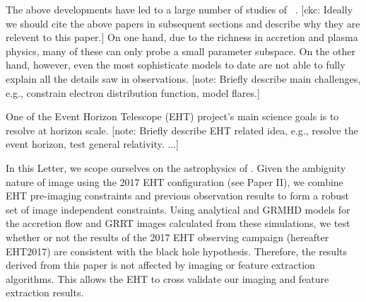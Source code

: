 \documentclass[twocolumn,tighten,dvipsnames,linenumbers]{aastex63}
\newcommand\note[1]{{\color{OliveGreen}[note: #1]}}
\newcommand\ckc[1]{{\color{MidnightBlue}[ckc: #1]}}
\begin{document}

The above developments have led to a large number of studies of
\sgra~\citep[e.g.,][]{2006MNRAS.370..219M, 2007MNRAS.379.1519M,
  2009A&A...508L..13M, 2009ApJ...698..676D, 2009ApJ...701..521C,
  2009ApJ...706..497M, 2012ApJ...746L..10D, 2012MNRAS.421.1315Z,
  2013A&A...559L...3M, 2014A&A...570A...7M, 2014ApJ...790....1B,
  2015A&A...576A..41B, 2015ApJ...799....1C, 2015ApJ...802...69B,
  2015ApJ...812..103C, 2015Sci...350.1242J, 2016A&A...588A..57F,
  2016ApJ...817..173L, 2016ApJ...824...40O, 2016ApJ...826...77B,
  2016ApJ...831....4P, 2016MNRAS.455.2187M, 2017ApJ...837..180G,
  2017ApJ...844...35M, 2017ApJ...851..148M, 2017MNRAS.467.3604R,
  2018A&A...612A..34D, 2018ApJ...856..163M, 2018ApJ...859...60L,
  2018ApJ...863..148P, 2018ApJ...865..104J, 2018ApJ...868..101B,
  2018JCAP...07..015H, 2018MNRAS.478.1875J, 2018MNRAS.478.5209C,
  2019ApJ...881L...2B, 2019ApJ...884..148B, 2019ApJ...886...96H,
  2020ApJ...896L...6R, 2020ApJ...897...99T, 2020MNRAS.492.3272R,
  2020MNRAS.493.1404A, 2020MNRAS.494.4168D, 2020MNRAS.494.5923P,
  2020arXiv200514251B, 2020MNRAS.497.4999D, 2020arXiv200603658P,
  2020ApJ...896L...6R}.
\ckc{Ideally we should cite the above papers in subsequent sections
  and describe why they are relevent to this paper.}
On one hand, due to the richness in accretion and plasma physics, many
of these can only probe a small parameter subspace.
On the other hand, however, even the most sophisticate models to date
are not able to fully explain all the details saw in observations.
\note{Briefly describe main challenges, e.g., constrain electron
  distribution function, model flares.}


One of the Event Horizon Telescope (EHT) project's main science goals
is to resolve \sgra at horizon scale.
\note{Briefly describe EHT related idea, e.g., resolve the event
  horizon, test general relativity.
  ...}

In this Letter, we scope ourselves on the astrophysics of \sgra.
Given the ambiguity nature of \sgra image using the 2017 EHT
configuration (see Paper II), we combine EHT pre-imaging constraints
and previous observation results to form a robust set of image
independent constraints.
Using analytical and GRMHD models for the accretion flow and GRRT
images calculated from these simulations, we test whether or not the
results of the 2017 EHT observing campaign (hereafter EHT2017) are
consistent with the black hole hypothesis.
Therefore, the results derived from this paper is not affected by
imaging or feature extraction algorithms.
This allows the EHT to cross validate our imaging and feature
extraction results.
\end{document}
